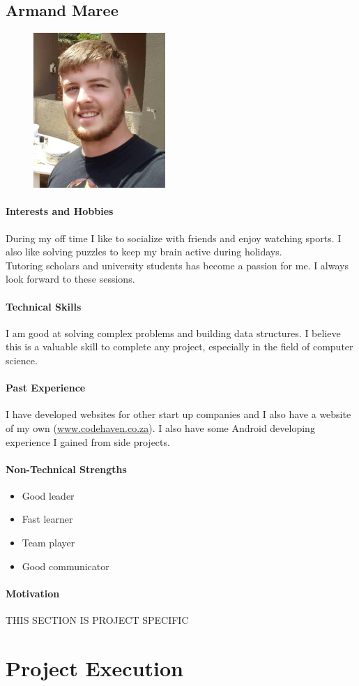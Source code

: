 \documentclass[english]{article}
\begin{document}
		\subsection{Armand Maree}
			\begin{figure}
				\begin{center}
					\includegraphics[width=5cm]{armand.jpg}
				\end{center}
			\end{figure}
			\paragraph{Interests and Hobbies}
			During my off time I like to socialize with friends and enjoy watching sports. I also like solving puzzles to keep my brain active during holidays.\\
			Tutoring scholars and university students has become a passion for me. I always look forward to these sessions.
			
			\paragraph{Technical Skills}
			I am good at solving complex problems and building data structures. I believe this is a valuable skill to complete any project, especially in the field of computer science.
			
			\paragraph{Past Experience}
			I have developed websites for other start up companies and I also have a website of my own (\href{http://www.codehaven.co.za}{www.codehaven.co.za}).
			I also have some Android developing experience I gained from side projects.
			
			\paragraph{Non-Technical Strengths}
			\begin{itemize}
				\setlength\itemsep{0.2em}
				\item Good leader
				\item Fast learner
				\item Team player
				\item Good communicator
			\end{itemize}
			
			\paragraph{Motivation}
			THIS SECTION IS PROJECT SPECIFIC
			
	\newpage
	\section{Project Execution}
\end{document}
